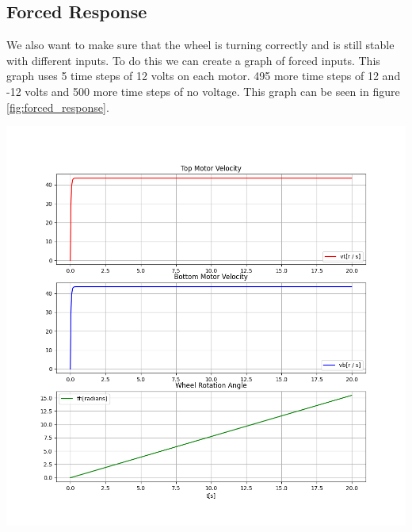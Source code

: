 \documentclass{scrartcl}
\begin{document}
\subsection{Forced Response}
We also want to make sure that the wheel is turning correctly and is still stable with different inputs. To do this we can create a graph of forced inputs. This graph uses 5 time steps of 12 volts on each motor. 495 more time steps of 12 and -12 volts and 500 more time steps of no voltage. This graph can be seen in figure \ref{fig:forced_response}.

\begin{minipage}{.45\textwidth}
    \centering
    \includegraphics[width=\textwidth]{step_response.png}
    \label{fig:step_response}
\end{minipage}
\end{document}
